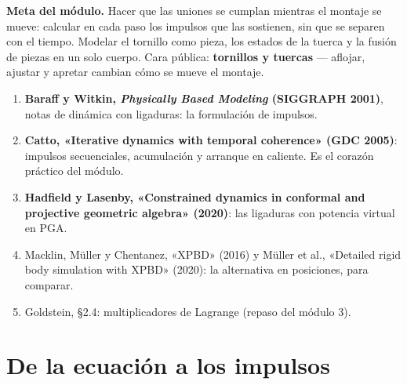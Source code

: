 \documentclass[11pt,a4paper]{article}
\begin{document}
\maketitle
\vspace{-2.5em}

\begin{meta}
\textbf{\textcolor{amarillo}{Meta del módulo.}} Hacer que las uniones se cumplan mientras el montaje se mueve:
calcular en cada paso los impulsos que las sostienen, sin que se separen con el tiempo. Modelar el tornillo como pieza,
los estados de la tuerca y la fusión de piezas en un solo cuerpo. Cara pública: \textbf{tornillos y tuercas} —
aflojar, ajustar y apretar cambian cómo se mueve el montaje.
\end{meta}

\begin{lectura}
\begin{enumerate}[leftmargin=*]
  \item \textbf{Baraff y Witkin, \emph{Physically Based Modeling} (SIGGRAPH 2001)}, notas de dinámica con
        ligaduras: la formulación de impulsos.
  \item \textbf{Catto, «Iterative dynamics with temporal coherence» (GDC 2005)}: impulsos secuenciales,
        acumulación y arranque en caliente. Es el corazón práctico del módulo.
  \item \textbf{Hadfield y Lasenby, «Constrained dynamics in conformal and projective geometric algebra» (2020)}:
        las ligaduras con potencia virtual en PGA.
  \item Macklin, Müller y Chentanez, «XPBD» (2016) y Müller et al., «Detailed rigid body simulation with XPBD»
        (2020): la alternativa en posiciones, para comparar.
  \item Goldstein, §2.4: multiplicadores de Lagrange (repaso del módulo 3).
\end{enumerate}
\end{lectura}

\section{De la ecuación a los impulsos}
\end{document}
